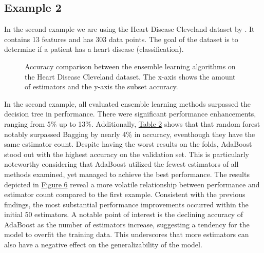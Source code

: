\newpage %
\subsection{Example 2}
In the second example we are using the Heart Disease Cleveland dataset by
\citet*{heart_disease_cleveland}. It contains 13 features and has 303 data 
points. The goal of the dataset is to determine if a patient has a heart
disease (classification).



\begin{figure}[htbp]
    \centering
    \label{fig:hdc_comparison}
    \caption{
        Accuracy comparison between the ensemble learning algorithms on the Heart Disease Cleveland dataset.
        The x-axis shows the amount of estimators and the y-axis the subset accuracy.
    }
\end{figure}

In the second example, all evaluated ensemble learning methods surpassed the decision tree in performance.
There were significant performance enhancements, ranging from 5\% up to 13\%.
Additionally, \hyperref[tab:hdc_table]{Table 2} shows that that random forest notably surpassed Bagging by
nearly 4\% in accuracy, eventhough they have the same estimator count.
Despite having the worst results on the folds, AdaBoost stood out with the highest accuracy on the validation set.
This is particularly noteworthy considering that AdaBoost utilized the fewest estimators of all methods examined,
yet managed to achieve the best performance.
The results depicted in \hyperref[fig:hdc_comparison]{Figure 6} reveal a more volatile relationship between
performance and estimator count compared to the first example. Consistent with the previous findings, the most
substantial performance improvements occurred within the initial 50 estimators.
A notable point of interest is the declining accuracy of AdaBoost as the number of estimators increase, suggesting
a tendency for the model to overfit the training data.
This underscores that more estimators can also have a negative effect on the generalizability of the model. 

